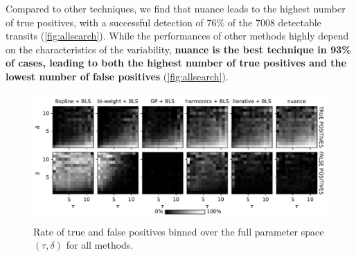 \documentclass[modern]{aastex631}
\newcommand{\nuancecode}{\textsf{nuance}}
\begin{document}
Compared to other techniques, we find that \nuancecode{} leads to the highest number of true positives, with a successful detection of 76\% of the 7008 detectable transits (\autoref{fig:allsearch}). While the performances of other methods highly depend on the characteristics of the variability, \textbf{\nuancecode{} is the best technique in 93\% of cases, leading to both the highest number of true positives and the lowest number of false positives} (\autoref{fig:allsearch}).
\begin{figure}[H]
    \begin{centering}
        \includegraphics[width=\linewidth]{../workflows/tess_injection_recovery/figures/tpfp_ims.pdf}
        \caption{Rate of true and false positives binned over the full parameter space $(\tau, \delta)$ for all methods.}
        \label{fig:allsearchim}
    \end{centering}
\end{figure}
\end{document}
